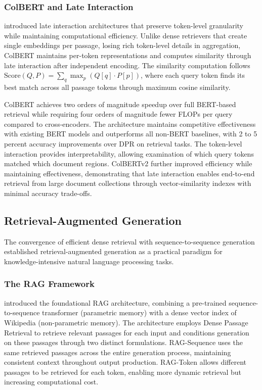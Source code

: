 \subsubsection{ColBERT and Late Interaction}

\citet{khattab2020colbert} introduced late interaction architectures that preserve token-level granularity while maintaining computational efficiency. Unlike dense retrievers that create single embeddings per passage, losing rich token-level details in aggregation, ColBERT maintains per-token representations and computes similarity through late interaction after independent encoding. The similarity computation follows $\text{Score}(Q, P) = \sum_q \max_p (Q[q] \cdot P[p])$, where each query token finds its best match across all passage tokens through maximum cosine similarity.

ColBERT achieves two orders of magnitude speedup over full BERT-based retrieval while requiring four orders of magnitude fewer FLOPs per query compared to cross-encoders. The architecture maintains competitive effectiveness with existing BERT models and outperforms all non-BERT baselines, with 2 to 5 percent accuracy improvements over DPR on retrieval tasks. The token-level interaction provides interpretability, allowing examination of which query tokens matched which document regions. ColBERTv2 \citep{santhanam2022colbertv2} further improved efficiency while maintaining effectiveness, demonstrating that late interaction enables end-to-end retrieval from large document collections through vector-similarity indexes with minimal accuracy trade-offs.

\subsection{Retrieval-Augmented Generation}

The convergence of efficient dense retrieval with sequence-to-sequence generation established retrieval-augmented generation as a practical paradigm for knowledge-intensive natural language processing tasks.

\subsubsection{The RAG Framework}

\citet{lewis2020retrieval} introduced the foundational RAG architecture, combining a pre-trained sequence-to-sequence transformer (parametric memory) with a dense vector index of Wikipedia (non-parametric memory). The architecture employs Dense Passage Retrieval to retrieve relevant passages for each input and conditions generation on these passages through two distinct formulations. RAG-Sequence uses the same retrieved passages across the entire generation process, maintaining consistent context throughout output production. RAG-Token allows different passages to be retrieved for each token, enabling more dynamic retrieval but increasing computational cost.

